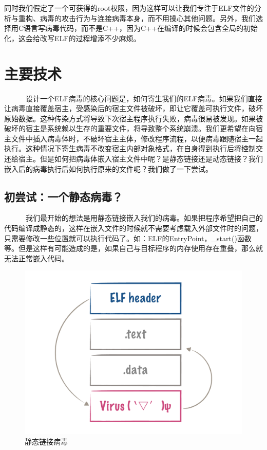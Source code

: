 \documentclass[a4paper, 11pt]{article}
\begin{document}
	同时我们假定了一个可获得的root权限，因为这样可以让我们专注于ELF文件的分析与重构、病毒的攻击行为与连接病毒本身，而不用操心其他问题。另外，我们选择用C语言写病毒代码，而不是C++，因为C++在编译的时候会包含全局的初始化，这会给改写ELF的过程增添不少麻烦。

\newpage
\section{主要技术}
~~~~~~设计一个ELF病毒的核心问题是，如何寄生我们的ELF病毒。如果我们直接让病毒直接覆盖宿主，受感染后的宿主文件被破坏，即让它覆盖可执行文件，破坏原始数据。这种传染方式将导致下次宿主程序执行失败，病毒很易被发现。如果被破坏的宿主是系统赖以生存的重要文件，将导致整个系统崩溃。我们更希望在向宿主文件中插入病毒体时，不破坏宿主主体，修改程序流程，以便病毒跟随宿主一起执行。这种情况下寄生病毒不改变宿主内部对象格式，在自身得到执行后将控制交还给宿主。但是如何把病毒体嵌入宿主文件中呢？是静态链接还是动态链接？我们嵌入后的病毒执行后如何执行原来的文件呢？我们做了一下尝试。
\subsection{初尝试：一个静态病毒？}
~~~~~~我们最开始的想法是用静态链接嵌入我们的病毒。如果把程序希望把自己的代码编译成静态的，这样在嵌入文件的时候就不需要考虑载入外部文件时的问题，只需要修改一些位置就可以执行代码了。如：ELF的EntryPoint，\_start()函数等。但是这样有可能造成的是，如果自己与目标程序的内存使用存在重叠，那么就无法正常嵌入代码。
\vspace{1em}
	\begin{figure}[htbp]
		\centering
		\includegraphics[width = \textwidth]{figures/fig1_order}
		\caption{静态链接病毒}
		\label{fig:way1}
	\end{figure}
\end{document}
